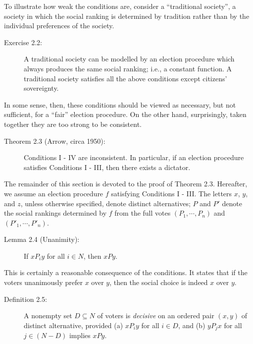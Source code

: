 \documentclass{article}
\begin{document}
To illustrate how weak the conditions are, consider a ``traditional society'', a society in which the social ranking is determined by tradition rather than by the individual preferences of the society.

\begin{description}

\item[Exercise 2.2:] A traditional society can be modelled by an election procedure which always produces the same social ranking; i.e., a constant function. A traditional society satisfies all the above conditions except citizens' sovereignty.

\end{description}

In some sense, then, these conditions should be viewed as necessary, but not sufficient, for a ``fair'' election procedure. On the other hand, surprisingly, taken together they are too strong to be consistent.

\begin{description}

\item[Theorem 2.3 (Arrow, circa 1950):] Conditions I - IV are inconsistent. In particular, if an election procedure satisfies Conditions I - III, then there exists a dictator.

\end{description}

The remainder of this section is devoted to the proof of Theorem 2.3. Hereafter, we assume an election procedure $f$ satisfying Conditions I - III. The letters $x$, $y$, and $z$, unless otherwise specified, denote distinct alternatives; $P$ and $P'$ denote the social rankings determined by $f$ from the full votes $(P_{1}, \cdots, P_{n})$ and $(P'_{1}, \cdots, P'_{n})$.

\begin{description}

\item[Lemma 2.4 (Unanimity):] If $xP_{i}y$ for all $i \in N$, then $xPy$.


\end{description}

This is certainly a reasonable consequence of the conditions. It states that if the voters unanimously prefer $x$ over $y$, then the social choice is indeed $x$ over $y$.

\begin{description}

\item[Definition 2.5:] A nonempty set $D \subseteq N$ of voters is \emph{decisive} on an ordered pair $(x,y)$ of distinct alternative, provided (a) $xP_{i}y$ for all $i \in D$, and (b) $yP_{j}x$ for all $j \in (N - D)$ implies $xPy$.

\end{description}
\end{document}

